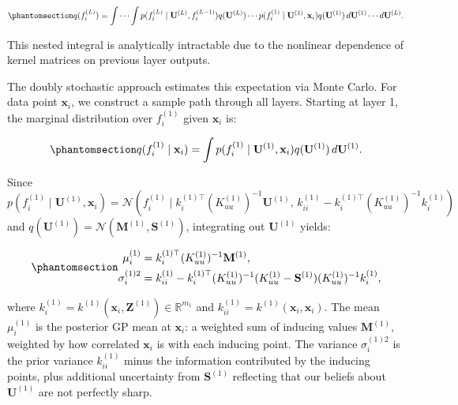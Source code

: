 \documentclass[
  letterpaper,
  DIV=11,
  numbers=noendperiod]{scrartcl}
\begin{document}
\begin{equation}\phantomsection\label{eq-marginal_q_output}{
q(f_i^{(L)}) = \int \cdots \int p(f_i^{(L)} \mid \mathbf{U}^{(L)}, f_i^{(L-1)}) q(\mathbf{U}^{(L)}) \cdots p(f_i^{(1)} \mid \mathbf{U}^{(1)}, \mathbf{x}_i) q(\mathbf{U}^{(1)}) \, d\mathbf{U}^{(1)} \cdots d\mathbf{U}^{(L)}.
}\end{equation}

This nested integral is analytically intractable due to the nonlinear
dependence of kernel matrices on previous layer outputs.

The doubly stochastic approach estimates this expectation via Monte
Carlo. For data point \(\mathbf{x}_i\), we construct a sample path
through all layers. Starting at layer 1, the marginal distribution over
\(f_i^{(1)}\) given \(\mathbf{x}_i\) is:

\begin{equation}\phantomsection\label{eq-layer1_marginal}{
q(f_i^{(1)} \mid \mathbf{x}_i) = \int p(f_i^{(1)} \mid \mathbf{U}^{(1)}, \mathbf{x}_i) q(\mathbf{U}^{(1)}) \, d\mathbf{U}^{(1)}.
}\end{equation}

Since
\(p(f_i^{(1)} \mid \mathbf{U}^{(1)}, \mathbf{x}_i) = \mathcal{N}(f_i^{(1)} \mid k_i^{(1)\top} (K_{uu}^{(1)})^{-1} \mathbf{U}^{(1)}, \, k_{ii}^{(1)} - k_i^{(1)\top} (K_{uu}^{(1)})^{-1} k_i^{(1)})\)
and
\(q(\mathbf{U}^{(1)}) = \mathcal{N}(\mathbf{M}^{(1)}, \mathbf{S}^{(1)})\),
integrating out \(\mathbf{U}^{(1)}\) yields:

\begin{equation}\phantomsection\label{eq-layer1_moments}{
\begin{aligned}
\mu_i^{(1)} &= k_i^{(1)\top} (K_{uu}^{(1)})^{-1} \mathbf{M}^{(1)}, \\
\sigma_i^{(1)2} &= k_{ii}^{(1)} - k_i^{(1)\top} (K_{uu}^{(1)})^{-1} (K_{uu}^{(1)} - \mathbf{S}^{(1)}) (K_{uu}^{(1)})^{-1} k_i^{(1)},
\end{aligned}
}\end{equation}

where
\(k_i^{(1)} = k^{(1)}(\mathbf{x}_i, \mathbf{Z}^{(1)}) \in \mathbb{R}^{m_1}\)
and \(k_{ii}^{(1)} = k^{(1)}(\mathbf{x}_i, \mathbf{x}_i)\). The mean
\(\mu_i^{(1)}\) is the posterior GP mean at \(\mathbf{x}_i\): a weighted
sum of inducing values \(\mathbf{M}^{(1)}\), weighted by how correlated
\(\mathbf{x}_i\) is with each inducing point. The variance
\(\sigma_i^{(1)2}\) is the prior variance \(k_{ii}^{(1)}\) minus the
information contributed by the inducing points, plus additional
uncertainty from \(\mathbf{S}^{(1)}\) reflecting that our beliefs about
\(\mathbf{U}^{(1)}\) are not perfectly sharp.
\end{document}
